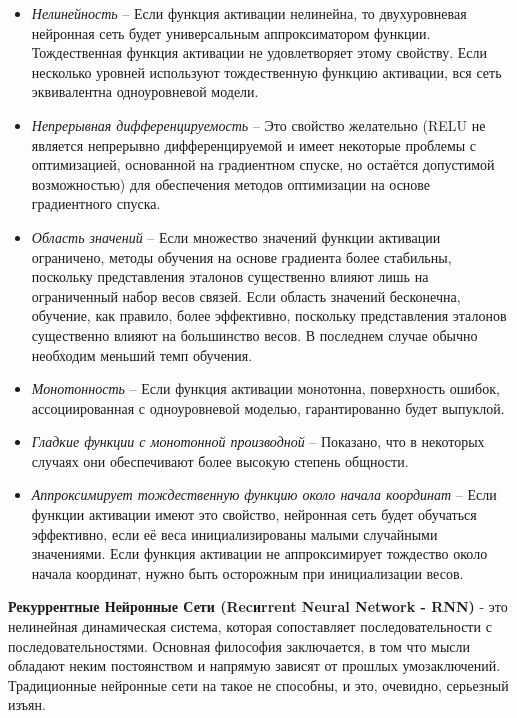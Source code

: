 \documentclass[a4paper,12pt]{article}
\begin{document}
	\begin{itemize}
		\item \textit{Нелинейность} – Если функция активации нелинейна, то двухуровневая нейронная сеть будет универсальным аппроксиматором функции. Тождественная функция активации не удовлетворяет этому свойству. Если несколько уровней используют тождественную функцию активации, вся сеть эквивалентна одноуровневой модели.
		
		\item \textit{Непрерывная дифференцируемость} – Это свойство желательно (RELU не является непрерывно дифференцируемой и имеет некоторые проблемы с оптимизацией, основанной на градиентном спуске, но остаётся допустимой возможностью) для обеспечения методов оптимизации на основе градиентного спуска.
		
		\item \textit{Область значений} – Если множество значений функции активации ограничено, методы обучения на основе градиента более стабильны, поскольку представления эталонов существенно влияют лишь на ограниченный набор весов связей. Если область значений бесконечна, обучение, как правило, более эффективно, поскольку представления эталонов существенно влияют на большинство весов. В последнем случае обычно необходим меньший темп обучения.
		
		\item \textit{Монотонность} – Если функция активации монотонна, поверхность ошибок, ассоциированная с одноуровневой моделью, гарантированно будет выпуклой.
		
		\item \textit{Гладкие функции с монотонной производной} – Показано, что в некоторых случаях они обеспечивают более высокую степень общности.
		 
		\item \textit{Аппроксимирует тождественную функцию около начала координат} – Если функции активации имеют это свойство, нейронная сеть будет обучаться эффективно, если её веса инициализированы малыми случайными значениями. Если функция активации не аппроксимирует тождество около начала координат, нужно быть осторожным при инициализации весов.
	\end{itemize}
	
	\textbf{Рекуррентные Нейронные Сети (Recиrrent Neural Network - RNN)} - это нелинейная динамическая система, которая сопоставляет последовательности с последовательностями. Основная философия заключается, в том что мысли обладают неким постоянством и напрямую зависят от прошлых умозаключений. Традиционные нейронные сети на такое не способны, и это, очевидно, серьезный изъян. 
	
\end{document}
